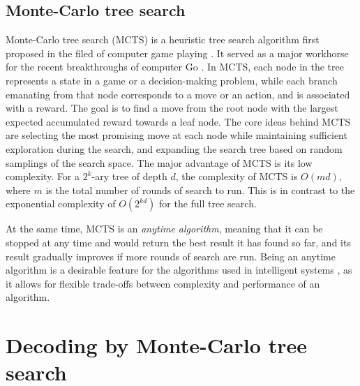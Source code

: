 \documentclass[conference,letterpaper]{IEEEtran}
\begin{document}
\subsection{Monte-Carlo tree search}
Monte-Carlo tree search (MCTS) is a heuristic tree search algorithm first proposed in the filed of computer game playing \cite{Remi_mcts06} \cite{Kocsis06banditbased}. It served as a major workhorse for the recent breakthroughs of computer Go \cite{AlphaGo} \cite{AlphaGoZero}.
In MCTS, each node in the tree represents a state in a game or a decision-making problem, while each branch emanating from that node corresponds to a move or an action, and is associated with a reward. The goal is to find a move from the root node with the largest expected accumulated reward towards a leaf node.
The core ideas behind MCTS are selecting the most promising move at each node while maintaining sufficient exploration during the search, and expanding the search tree based on random samplings of the search space. 
The major advantage of MCTS is its low complexity. For a $2^k$-ary tree of depth $d$, the complexity of MCTS is $O(md)$, where $m$ is the total number of rounds of search to run.
This is in contrast to the exponential complexity of $O(2^{kd})$ for the full tree search.

At the same time, MCTS is an \emph{anytime algorithm}, meaning that it can be stopped at any time and would return the best result it has found so far, and its result gradually improves if more rounds of search are run.
Being an anytime algorithm is a desirable feature for the algorithms used in intelligent systems \cite{Zilberstein_1996}, as it allows for flexible trade-offs between complexity and performance of an algorithm.



\section{Decoding by Monte-Carlo tree search}
\end{document}
